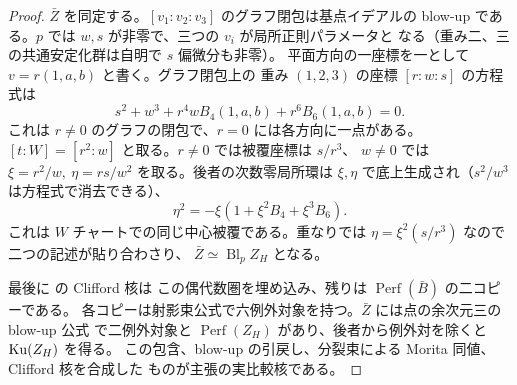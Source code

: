 \begin{proof}
$\bar Z$ を同定する。$[v_1:v_2:v_3]$ のグラフ閉包は基点イデアルの
blow-up である。$p$ では $w,s$ が非零で、三つの $v_i$ が局所正則パラメータと
なる（重み二、三の共通安定化群は自明で $s$ 偏微分も非零）。
平面方向の一座標を一として $v=r(1,a,b)$ と書く。グラフ閉包上の
重み $(1,2,3)$ の座標 $[r:w:s]$ の方程式は
\[
 s^2+w^3+r^4w B_4(1,a,b)+r^6B_6(1,a,b)=0 .
\]
これは $r\ne0$ のグラフの閉包で、$r=0$ には各方向に一点がある。
$[t:W]=[r^2:w]$ と取る。$r\ne0$ では被覆座標は $s/r^3$、
$w\ne0$ では $\xi=r^2/w,\ \eta=rs/w^2$ を取る。後者の次数零局所環は
$\xi,\eta$ で底上生成され（$s^2/w^3$ は方程式で消去できる）、
\[
              \eta^2=-\xi(1+\xi^2 B_4+\xi^3 B_6).
\]
これは $W$ チャートでの同じ中心被覆である。重なりでは
$\eta=\xi^2(s/r^3)$ なので二つの記述が貼り合わさり、
$\bar Z\simeq\operatorname{Bl}_p Z_H$ となる。

最後に \cite[Theorem~4.2]{NFMKuznetsovQuadric} の Clifford 核は
この偶代数圏を埋め込み、残りは $\operatorname{Perf}(\bar B)$ の二コピーである。
各コピーは射影束公式で六例外対象を持つ。$\bar Z$ には点の余次元三の
blow-up 公式 \cite[Theorem~4.3]{CMOOrlovBlowup}で二例外対象と
$\operatorname{Perf}(Z_H)$ があり、後者から例外対を除くと $\operatorname{Ku}(Z_H)$ を得る。
この包含、blow-up の引戻し、分裂束による Morita 同値、Clifford 核を合成した
ものが主張の実比較核である。
\end{proof}

